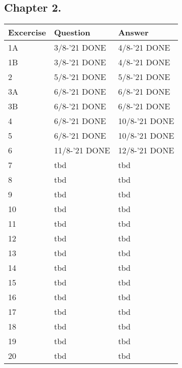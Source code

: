 \subsection*{Chapter 2.}
\begin{tabular}{|l|l|l|}
    \hline
    \rowcolor[HTML]{EFEFEF}
    {\color[HTML]{000000} Excercise } & {\color[HTML]{000000} Question } & {\color[HTML]{000000} Answer } \\ \hline
    1A & 3/8-'21 DONE & 4/8-'21 DONE \\ \hline
    1B & 3/8-'21 DONE & 4/8-'21 DONE \\ \hline
    2 & 5/8-'21 DONE & 5/8-'21 DONE \\ \hline
    3A & 6/8-'21 DONE & 6/8-'21 DONE \\ \hline
    3B & 6/8-'21 DONE & 6/8-'21 DONE \\ \hline
    4 & 6/8-'21 DONE & 10/8-'21 DONE \\ \hline
    5 & 6/8-'21 DONE & 10/8-'21 DONE \\ \hline
    6 & 11/8-'21 DONE & 12/8-'21 DONE \\ \hline
    7 & tbd & tbd \\ \hline
    8 & tbd & tbd \\ \hline
    9 & tbd & tbd \\ \hline
    10 & tbd & tbd \\ \hline
    11 & tbd & tbd \\ \hline
    12 & tbd & tbd \\ \hline
    13 & tbd & tbd \\ \hline
    14 & tbd & tbd \\ \hline
    15 & tbd & tbd \\ \hline
    16 & tbd & tbd \\ \hline
    17 & tbd & tbd \\ \hline
    18 & tbd & tbd \\ \hline
    19 & tbd & tbd \\ \hline
    20 & tbd & tbd \\ \hline
\end{tabular}

